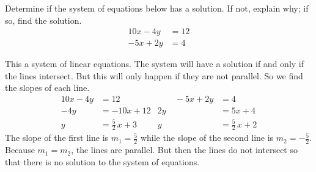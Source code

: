 \documentclass[11pt,letterpaper]{article}
\begin{document}
\newpage





 Determine if the system of equations below has a solution. If not, explain why; if so, find the solution. 
	\[
	\begin{aligned}
	10x - 4y&= 12 \\
	-5x + 2y&= 4
	\end{aligned}
	\] \pspace

\sol This a system of linear equations. The system will have a solution if and only if the lines intersect. But this will only happen if they are not parallel. So we find the slopes of each line.
	\[
	\begin{aligned}
	10x - 4y&= 12 &\quad\quad -5x + 2y&= 4 \\
	-4y&= -10x + 12 & 2y&= 5x + 4 \\
	y&= \frac{5}{2}\,x + 3 & y&= \frac{5}{2}\,x + 2
	\end{aligned}
	\]
The slope of the first line is $m_1= \frac{5}{2}$ while the slope of the second line is $m_2= -\frac{5}{2}$. Because $m_1= m_2$, the lines are parallel. But then the lines do not intersect so that there is no solution to the system of equations.


\end{document}
